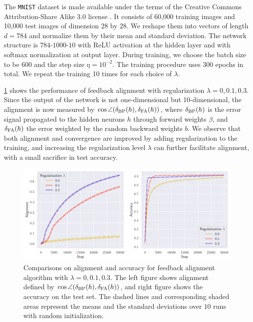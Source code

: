 The \texttt{MNIST} dataset is made available under the terms of the Creative Commons Attribution-Share Alike 3.0 license \citep{deng2012mnist}. It consists of 60,000 training images and 10,000 test images of dimension $28$ by $28$. We reshape them into vectors of length $d = 784$ and normalize them by their mean and standard deviation. The network structure is $784$-$1000$-$10$ with ReLU activation at the hidden layer and with softmax normalization at output layer. During training, we choose the batch size to be $600$ and the step size $\eta = 10^{-2}$. The training procedure uses $300$ epochs in total. We repeat the training 10 times for each choice of $\lambda$.

\cref{fig:mnist} shows the performance of feedback alignment with regularization $\lambda = 0, 0.1, 0.3$. Since the output of the network is not one-dimensional but 10-dimensional, the alignment is now measured by $\cos \angle(\delta_\mathrm{BP}(h),\delta_\mathrm{FA}(h))$, where $\delta_\mathrm{BP}(h)$ is the error signal propagated to the hidden neurons $h$ through forward weights $\beta$, and $\delta_\mathrm{FA}(h)$ the error weighted by the random backward weights $b$. We observe that both alignment and convergence are improved by adding regularization to the training, and increasing the regularization level $\lambda$ can further facilitate alignment, with a small sacrifice in test accuracy.

\begin{figure}[t]
  \centering
  \includegraphics[width=\textwidth]{figures/mnist_2l_v6_horizontal.pdf}
  \caption{Comparisons on alignment and accuracy for feedback alignment algorithm with $\lambda=0,0.1,0.3$. The left figure shows alignment defined by $\cos \angle(\delta_\mathrm{BP}(h),\delta_\mathrm{FA}(h))$, and right figure shows the accuracy on the test set. The dashed lines and corresponding shaded areas represent the means and the standard deviations over $10$ runs with random initialization.}
  \label{fig:mnist}
\end{figure}
